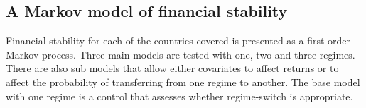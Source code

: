 \documentclass[12pt, a4paper, oneside]{article} %
\begin{document}


\subsection{A Markov model of financial stability}
Financial stability for each of the countries covered is presented as a first-order Markov process.  Three main models are tested with one, two and three regimes.  There are also sub models that allow either covariates to affect returns or to affect the probability of transferring from one regime to another. The base model with one regime is a control that assesses whether regime-switch is appropriate. 
\end{document}
